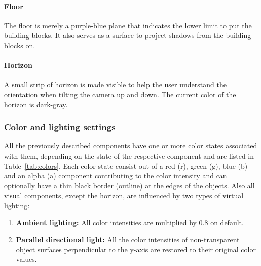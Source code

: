 \paragraph{Floor}
The floor is merely a purple-blue plane that indicates the lower limit to put the building blocks. It also serves as a surface to project shadows from the building blocks on.

\paragraph{Horizon}
A small strip of horizon is made visible to help the user understand the orientation when tilting the camera up and down. The current color of the horizon is dark-gray.


\subsubsection{Color and lighting settings}

All the previously described components have one or more color states associated with them, depending on the state of the respective component and are listed in Table~\ref{tab:colors}. Each  color state consist out of a red (r), green (g), blue (b) and an alpha (a) component contributing to the color intensity and can optionally have a thin black border (outline) at the edges of the objects. Also all visual components, except the horizon, are influenced by two types of virtual lighting: 
\begin{enumerate}
	\item{\textbf{Ambient lighting:}} All color intensities are multiplied by $0.8$ on default.
	\item{\textbf{Parallel directional light:}} All the color intensities of non-transparent object surfaces perpendicular to the y-axis are restored to their original color values.
\end{enumerate}


